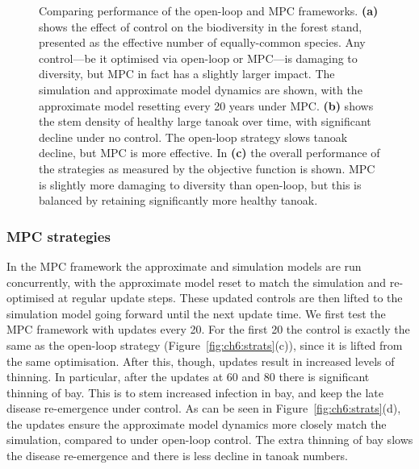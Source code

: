 \begin{figure}[t]
    \begin{center}
        \caption[Comparing the open-loop and MPC frameworks]{Comparing performance of the open-loop and MPC frameworks. \textbf{(a)} shows the effect of control on the biodiversity in the forest stand, presented as the effective number of equally-common species. Any control---be it optimised via open-loop or MPC---is damaging to diversity, but MPC in fact has a slightly larger impact. The simulation and approximate model dynamics are shown, with the approximate model resetting every 20 years under MPC. \textbf{(b)} shows the stem density of healthy large tanoak over time, with significant decline under no control. The open-loop strategy slows tanoak decline, but MPC is more effective. In \textbf{(c)} the overall performance of the strategies as measured by the objective function is shown. MPC is slightly more damaging to diversity than open-loop, but this is balanced by retaining significantly more healthy tanoak.\label{fig:ch6:strat_compare}}
    \end{center}
\end{figure}

\subsubsection{MPC strategies}

In the MPC framework the approximate and simulation models are run concurrently, with the approximate model reset to match the simulation and re-optimised at regular update steps. These updated controls are then lifted to the simulation model going forward until the next update time. We first test the MPC framework with updates every \SI{20}{\years}. For the first \SI{20}{\years} the control is exactly the same as the open-loop strategy (Figure~\ref{fig:ch6:strats}(c)), since it is lifted from the same optimisation. After this, though, updates result in increased levels of thinning. In particular, after the updates at 60 and \SI{80}{\years} there is significant thinning of bay. This is to stem increased infection in bay, and keep the late disease re-emergence under control. As can be seen in Figure~\ref{fig:ch6:strats}(d), the updates ensure the approximate model dynamics more closely match the simulation, compared to under open-loop control. The extra thinning of bay slows the disease re-emergence and there is less decline in tanoak numbers.

